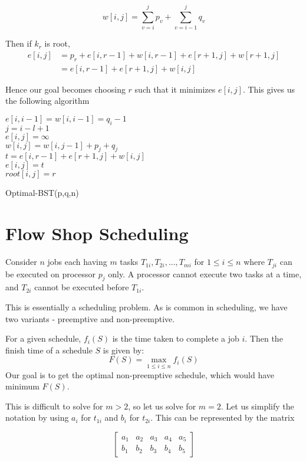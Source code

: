 \documentclass[12pt,letterpaper]{article}
\theoremstyle{definition}
\begin{document}
\[w[i,j] = \sum_{v=i}^j p_v + \sum_{v=i-1}^j q_v\]

Then if $k_r$ is root,
\begin{align*}
  e[i,j] &=  p_r + e[i,r-1] + w[i,r-1] + e[r+1,j] + w[r+1,j] \\
         &= e[i,r-1] + e[r+1,j] + w[i,j]
\end{align*}

Hence our goal becomes choosing $r$ such that it minimizes $e[i,j]$. This gives us the following algorithm

\begin{algorithm}[H]
  \SetAlgoLined
   {
    $e[i,i-1] = w[i,i-1] = q_i-1$ \\
  }
   {
     {
      $j = i-l+1$ \\
      $e[i,j] = \infty$ \\
      $w[i,j] = w[i,j-1] + p_j + q_j$ \\
       {
        $t = e[i,r-1] + e[r+1,j] + w[i,j]$ \\
         {
          $e[i,j] = t$ \\
          $root[i,j] = r$
        }
      }
    }
  }
  \caption{Optimal-BST(p,q,n)}
\end{algorithm}

\section{Flow Shop Scheduling}

Consider $n$ jobs each having $m$ tasks $T_{1i}, T_{2i}, ... , T_{mi}$ for $1 \leq i \leq n$ where $T_{ji}$ can be executed on processor $p_j$ only. A processor cannot execute two tasks at a time, and $T_{2i}$ cannot be executed before $T_{1i}$.

This is essentially a scheduling problem. As is common in scheduling, we have two variants - preemptive and non-preemptive.

For a given schedule, $f_i(S)$ is the time taken to complete a job $i$. Then the finish time of a schedule $S$ is given by:
\[F(S) = \max_{1 \leq i \leq n} f_i(S)\]
Our goal is to get the optimal non-preemptive schedule, which would have minimum $F(S)$.

This is difficult to solve for $m > 2$, so let us solve for $m=2$. Let us simplify the notation by using $a_i$ for $t_{1i}$ and $b_i$ for $t_{2i}$. This can be represented by the matrix

\[\begin{bmatrix}
  a_1 & a_2 & a_3 & a_4 & a_5 \\
  b_1 & b_2 & b_3 & b_4 & b_5
\end{bmatrix}\]
\end{document}
